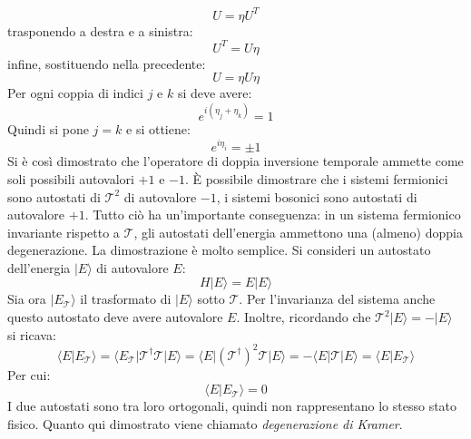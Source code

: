 \begin{equation}
U = \eta U^T
\end{equation}
trasponendo a destra e a sinistra:
\begin {equation}
U^T = U\eta
\end{equation}
infine, sostituendo nella precedente:
\begin{equation}
U = \eta U \eta
\end{equation}
Per ogni coppia di indici $j$ e $k$ si deve avere:
\begin{equation}
 e^{i(\eta_j + \eta_k)} = 1
\end{equation}
Quindi si pone $j = k$ e si ottiene:
\begin{equation}
 e^{i\eta_i} = \pm1
\end{equation}
Si è così dimostrato che l'operatore di doppia inversione temporale ammette come soli possibili autovalori $+1$ e $-1$.
È possibile dimostrare che i sistemi fermionici sono autostati di $\mathscr{T}^2$ di autovalore $-1$, i sistemi bosonici sono autostati di autovalore $+1$.
Tutto ciò ha un'importante conseguenza: in un sistema fermionico invariante rispetto a $\mathscr{T}$, gli autostati dell'energia ammettono una (almeno) doppia degenerazione.
La dimostrazione è molto semplice. Si consideri un autostato dell'energia $|E\rangle$ di autovalore $E$:
\begin{equation}
 H|E\rangle = E|E\rangle
\end{equation}
Sia ora $|E_{\mathscr{T}}\rangle$ il trasformato di $|E\rangle$ sotto $\mathscr{T}$. Per l'invarianza del sistema anche questo autostato deve avere autovalore $E$.
Inoltre, ricordando che $\mathscr{T}^2|E\rangle = -|E\rangle$ si ricava:
\begin{equation}
 \langle E|E_{\mathscr{T}}\rangle = \langle E_{\mathscr{T}}|\mathscr{T}^{\dag}\mathscr{T}|E\rangle = \langle E|(\mathscr{T}^{\dag})^2\mathscr{T}|E\rangle = -\langle E|\mathscr{T}|E\rangle = \langle E|E_{\mathscr{T}}\rangle
\end{equation}
Per cui:
\begin{equation}
 \langle E|E_{\mathscr{T}}\rangle = 0
\end{equation}
I due autostati sono tra loro ortogonali, quindi non rappresentano lo stesso stato fisico. Quanto qui dimostrato viene chiamato \emph{degenerazione di Kramer}\cite{BigiSanda}.